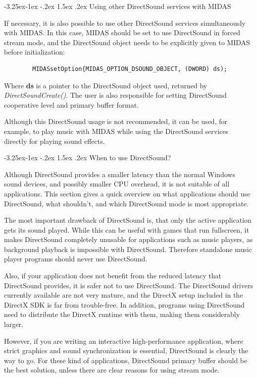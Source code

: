 \documentclass[a4paper,12pt,oneside]{book}
\makeatletter
\renewcommand\subsection{\@startsection{subsection}{2}{-20pt}%
                                     {-3.25ex\@plus -1ex \@minus -.2ex}%
                                     {1.5ex \@plus .2ex}%
                                     {\normalfont\large\bfseries}}
\newcommand{\mVariable}[1]{{\bf #1}}
\makeatother
\begin{document}
\subsection{Using other DirectSound services with MIDAS}

If necessary, it is also possible to use other DirectSound services
simultaneously with MIDAS. In this case, MIDAS should be set to use
DirectSound in forced stream mode, and the DirectSound object needs to be
explicitly given to MIDAS before initialization:
\begin{verbatim}
        MIDASsetOption{MIDAS_OPTION_DSOUND_OBJECT, (DWORD) ds);
\end{verbatim}
Where \mVariable{ds} is a pointer to the DirectSound object used, returned by
{\em DirectSoundCreate()}. The user is also responsible for setting
DirectSound cooperative level and primary buffer format.

Although this DirectSound usage is not recommended, it can be used, for
example, to play music with MIDAS while using the DirectSound services
directly for playing sound effects.


\subsection{When to use DirectSound?}

Although DirectSound provides a smaller latency than the normal Windows sound
devices, and possibly smaller CPU overhead, it is not suitable of all
applications. This section gives a quick overview on what applications should
use DirectSound, what shouldn't, and which DirectSound mode is most
appropriate.

The most important drawback of DirectSound is, that only the active
application gets its sound played. While this can be useful with games that
run fullscreen, it makes DirectSound completely unusable for applications
such as music players, as background playback is impossible with DirectSound.
Therefore standalone music player programs should never use DirectSound.

Also, if your application does not benefit from the reduced latency that
DirectSound provides, it is safer not to use DirectSound. The DirectSound
drivers currently available are not very mature, and the DirectX setup
included in the DirectX SDK is far from trouble-free. In addition, programs
using DirectSound need to distribute the DirectX runtime with them, making
them considerably larger.

However, if you are writing an interactive high-performance application,
where strict graphics and sound synchronization is essential, DirectSound is
clearly the way to go. For these kind of applications, DirectSound primary
buffer should be the best solution, unless there are clear reasons for using
stream mode.
\end{document}
